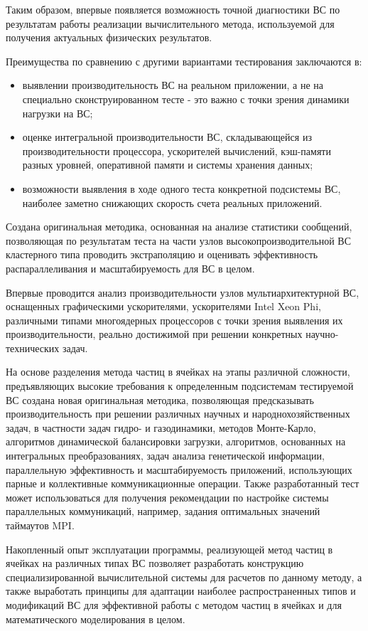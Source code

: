Таким образом, впервые появляется возможность точной диагностики ВС по результатам работы реализации вычислительного метода, используемой для получения актуальных физических результатов.   

Преимущества по сравнению с другими вариантами тестирования заключаются в:
\begin{itemize}
	\item выявлении производительность ВС на реальном приложении, а не на специально сконструированном тесте - это важно с точки зрения динамики нагрузки на ВС; 
	
	\item оценке интегральной производительности ВС, складывающейся из производительности процессора, ускорителей вычислений, кэш-памяти разных уровней, оперативной памяти и системы хранения данных;
	\item возможности выявления в ходе одного теста конкретной подсистемы ВС, наиболее заметно снижающих скорость счета реальных приложений. 
	
\end{itemize}
Создана оригинальная методика, основанная на анализе статистики сообщений, позволяющая по результатам теста на части узлов высокопроизводительной ВС кластерного типа проводить экстраполяцию и оценивать эффективность распараллеливания и масштабируемость для ВС в целом.

Впервые проводится анализ производительности узлов мультиархитектурной ВС, оснащенных графическими ускорителями, ускорителями Intel Xeon Phi, различными типами многоядерных процессоров с точки зрения выявления их производительности, реально достижимой при решении конкретных научно-технических задач.

На основе разделения метода частиц в ячейках на этапы различной сложности, предъявляющих высокие требования к определенным подсистемам тестируемой ВС создана новая оригинальная методика, позволяющая предсказывать производительность при решении различных научных и народнохозяйственных задач, в частности задач гидро- и газодинамики, методов Монте-Карло, алгоритмов динамической балансировки загрузки, алгоритмов, основанных на интегральных преобразованиях, задач анализа генетической информации, параллельную эффективность и масштабируемость приложений, использующих парные и коллективные коммуникационные операции. Также разработанный тест может использоваться для получения рекомендации по настройке системы параллельных коммуникаций, например, задания оптимальных значений таймаутов MPI.


{\influence} Накопленный опыт эксплуатации программы, реализующей метод частиц в ячейках на различных типах ВС позволяет разработать конструкцию специализированной вычислительной системы для расчетов по данному методу, а также выработать принципы для адаптации наиболее распространенных типов и модификаций ВС для эффективной работы с методом частиц в ячейках и для математического моделирования в целом.

